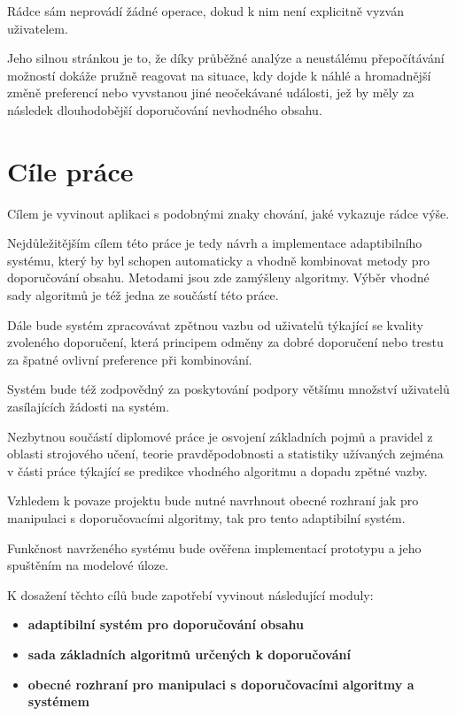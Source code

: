 \documentclass[thesis=M,czech]{FITthesis}[2014/05/07]
\begin{document}
\begin{introduction}
	Rádce sám neprovádí žádné operace, dokud k nim není explicitně vyzván uživatelem.
	
	Jeho silnou stránkou je to, že díky průběžné analýze a neustálému přepočítávání možností dokáže pružně reagovat na situace, kdy dojde k náhlé a hromadnější změně preferencí nebo vyvstanou jiné neočekávané události, jež by měly za následek dlouhodobější doporučování nevhodného obsahu.
	
\section{Cíle práce}
\label{sec:objectives}
	Cílem je vyvinout aplikaci s podobnými znaky chování, jaké vykazuje rádce výše.

	Nejdůležitějším cílem této práce je tedy návrh a implementace adaptibilního systému, který by byl schopen automaticky a vhodně kombinovat metody pro doporučování obsahu. Metodami jsou zde zamýšleny algoritmy. Výběr vhodné sady algoritmů je též jedna ze součástí této práce.
	
	Dále bude systém zpracovávat zpětnou vazbu od uživatelů týkající se kvality zvoleného doporučení, která principem odměny za dobré doporučení nebo trestu za špatné ovlivní preference při kombinování.
	
	Systém bude též zodpovědný za poskytování podpory většímu množství uživatelů zasílajících žádosti na systém.
	
	Nezbytnou součástí diplomové práce je osvojení základních pojmů a pravidel z oblasti strojového učení, teorie pravděpodobnosti a statistiky užívaných zejména v části práce týkající se predikce vhodného algoritmu a dopadu zpětné vazby. 
	
	Vzhledem k povaze projektu bude nutné navrhnout obecné rozhraní jak pro manipulaci s doporučovacími algoritmy, tak pro tento adaptibilní systém.
	
	Funkčnost navrženého systému bude ověřena implementací prototypu a jeho spuštěním na modelové úloze.
	
	K dosažení těchto cílů bude zapotřebí vyvinout následující moduly:

\begin{itemize}
  \item \textbf{adaptibilní systém pro doporučování obsahu}
  \item \textbf{sada základních algoritmů určených k doporučování}
  \item \textbf{obecné rozhraní pro manipulaci s doporučovacími algoritmy a systémem}
\end{itemize}	


\end{introduction}
\end{document}
